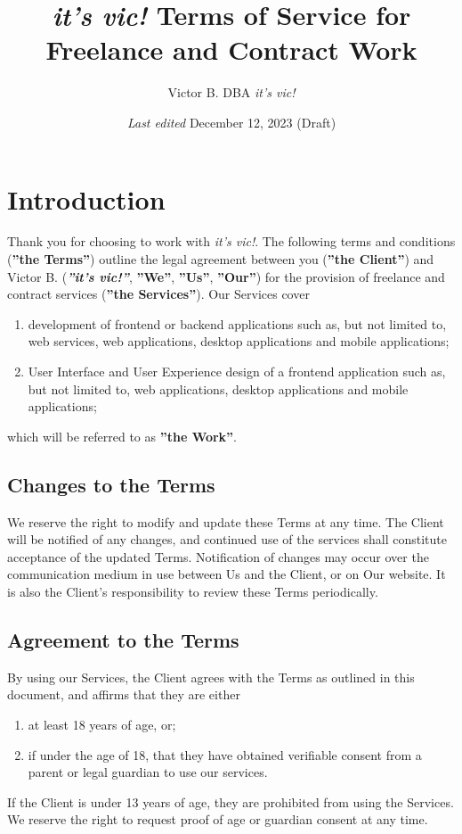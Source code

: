 \documentclass{article}
\title{\textit{it's vic!} Terms of Service for Freelance and Contract Work}
\author{Victor B. DBA \textit{it's vic!}}
\date{\textit{Last edited} December 12, 2023 (Draft)}
\begin{document}
\maketitle
\tableofcontents

\renewcommand{\labelenumi}{\alph{enumi})}

\section{Introduction}
Thank you for choosing to work with \textit{it's vic!}. The following terms and conditions (\textbf{''the Terms''}) outline the legal agreement between you (\textbf{''the Client''}) and Victor B. (\textbf{\textit{''it's vic!''}}, \textbf{''We''}, \textbf{''Us''}, \textbf{''Our''}) for the provision of freelance and contract services (\textbf{''the Services''}). Our Services cover 
\begin{enumerate}
    \item development of frontend or backend applications such as, but not limited to, web services, web applications, desktop applications and mobile applications;
    \item User Interface and User Experience design of a frontend application such as, but not limited to, web applications, desktop applications and mobile applications;
\end{enumerate}
which will be referred to as \textbf{''the Work''}.

\subsection{Changes to the Terms}
We reserve the right to modify and update these Terms at any time. The Client will be notified of any changes, and continued use of the services shall constitute acceptance of the updated Terms. Notification of changes may occur over the communication medium in use between Us and the Client, or on Our website. It is also the Client's responsibility to review these Terms periodically.

\subsection{Agreement to the Terms}
By using our Services, the Client agrees with the Terms as outlined in this document, and affirms that they are either
\begin{enumerate}
    \item at least 18 years of age, or;
    \item if under the age of 18, that they have obtained verifiable consent from a parent or legal guardian to use our services.
\end{enumerate}
If the Client is under 13 years of age, they are prohibited from using the Services. We reserve the right to request proof of age or guardian consent at any time.
\end{document}
